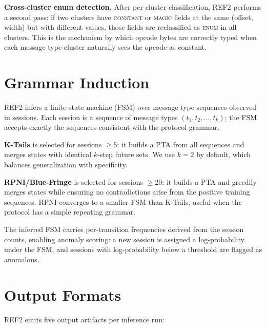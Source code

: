 \documentclass[letterpaper,twocolumn,10pt]{article}
\begin{document}
\textbf{Cross-cluster enum detection.}  After per-cluster classification,
\textsc{REF2} performs a second pass: if two clusters have \textsc{constant}
or \textsc{magic} fields at the same (offset, width) but with different values,
those fields are reclassified as \textsc{enum} in all clusters.  This is the
mechanism by which opcode bytes are correctly typed when each message type
cluster naturally sees the opcode as constant.

\section{Grammar Induction}
\label{sec:grammar}

\textsc{REF2} infers a finite-state machine (FSM) over message type sequences
observed in sessions.  Each session is a sequence of message types
$(t_1, t_2, \ldots, t_k)$; the FSM accepts exactly the sequences consistent
with the protocol grammar.

\textbf{K-Tails} is selected for sessions $\geq 5$: it builds a PTA from
all sequences and merges states with identical $k$-step future sets.  We use
$k = 2$ by default, which balances generalization with specificity.

\textbf{RPNI/Blue-Fringe} is selected for sessions $\geq 20$: it builds a PTA
and greedily merges states while ensuring no contradictions arise from the
positive training sequences.  RPNI converges to a smaller FSM than K-Tails,
useful when the protocol has a simple repeating grammar.

The inferred FSM carries per-transition frequencies derived from the session
counts, enabling anomaly scoring: a new session is assigned a log-probability
under the FSM, and sessions with log-probability below a threshold are flagged
as anomalous.

\section{Output Formats}
\label{sec:output}

\textsc{REF2} emits five output artifacts per inference run:
\end{document}
